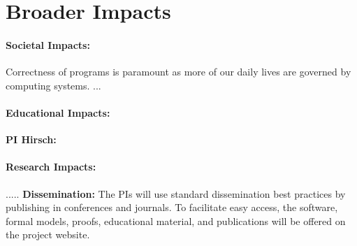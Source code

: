 \section{Broader Impacts}
\label{sec:broader}



\paragraph{Societal Impacts:} Correctness of programs is paramount as more of our daily lives are governed by computing systems.  ...

\paragraph{Educational Impacts:}
{\bf PI Hirsch:}

\paragraph{Research Impacts:}
.....
{\bf Dissemination:}
The PIs will use standard dissemination best practices by publishing in
conferences and journals. To facilitate easy access, the software, formal models, proofs, educational material, and publications will be offered on the project website. 
